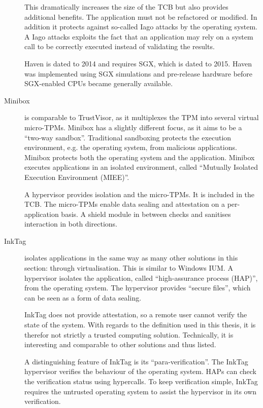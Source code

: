 \begin{description}
This dramatically increases the size of the TCB but also provides additional benefits.\label{ID_967837581}
The application must not be refactored or modified.\label{ID_40595564}
In addition it protects against so-called Iago attacks by the operating system. A Iago attacks exploits the fact that an application may rely on a system call to be correctly executed instead of validating the results.\label{ID_810626140}

Haven is dated to 2014 and requires SGX, which is dated to 2015. Haven was implemented using SGX simulations and pre-release hardware before SGX-enabled CPUs became generally available.\label{ID_775639108}
\item[Minibox\cite{Li2014}]\label{ID_1759565280}
is comparable to TrustVisor, as it multiplexes the TPM into several virtual micro-TPMs.\label{ID_708706069}
Minibox has a slightly different focus, as it aims to be a ``two-way sandbox''.\label{ID_1073668755}
Traditional sandboxing protects the execution environment, e.g. the operating system, from malicious applications.\label{ID_1512132230}
Minibox protects both the operating system and the application.\label{ID_686729196}
Minibox executes applications in an isolated environment, called ``Mutually Isolated Execution Environment (MIEE)''.\label{ID_1462001648}

A hypervisor provides isolation and the micro-TPMs. It is included in the TCB.\label{ID_44939342}
The micro-TPMs enable data sealing and attestation on a per-application basis.\label{ID_1229123325}
A shield module in between checks and sanitises interaction in both directions.\label{ID_71322980}
\item[InkTag\cite{Hofmann2013}]\label{ID_1193381543}
isolates applications in the same way as many other solutions in this section: through virtualisation. This is similar to Windows IUM.\label{ID_330168128}
A hypervisor isolates the application, called ``high-assurance process (HAP)'', from the operating system.\label{ID_751005955}
The hypervisor provides ``secure files'', which can be seen as a form of data sealing.\label{ID_1357961035}

InkTag does not provide attestation, so a remote user cannot verify the state of the system.\label{ID_705281429}
With regards to the definition used in this thesis, it is therefor not strictly a trusted computing solution. Technically, it is interesting and comparable to other solutions and thus listed.\label{ID_643772456}

A distinguishing feature of InkTag is its ``para-verification''. The InkTag hypervisor verifies the behaviour of the operating system. HAPs can check the verification status using hypercalls.\label{ID_192984381}
To keep verification simple, InkTag requires the untrusted operating system to assist the hypervisor in its own verification.\label{ID_1553347413}


\end{description}
